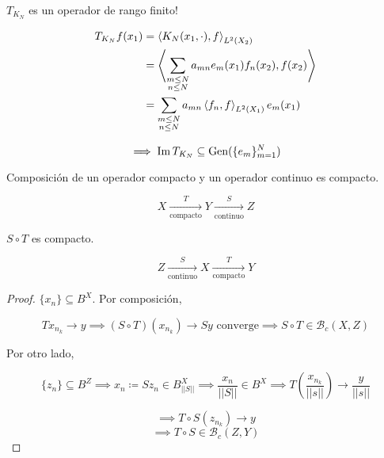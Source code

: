 \begin{fexample}
   $T_{K_N}$ es un operador de rango finito!

   \begin{align*}
       T_{K_N} f(x_1)&=\left\langle K_N(x_1,\cdot),f\right\rangle_{L^2(X_2)}\\
       &=\left\langle \sum_{\substack{m\leq N\\n\leq N}}a_{mn}e_m(x_1)f_n(x_2),f(x_2)\right\rangle\\
       &=\sum_{\substack{m\leq N\\n\leq N}}a_{mn}\left\langle f_n,f\right\rangle_{L^2(X_1)}e_m(x_1)
   \end{align*}

   \[\implies \operatorname{Im} T_{K_N}\subseteq \operatorname{Gen}(\{e_m\}_{m=1}^N)\]
\end{fexample}

\begin{fproposition}
   Composición de un operador compacto y un operador continuo es compacto.

   \[X\xrightarrow[\text{compacto}]{T}Y\xrightarrow[\text{continuo}]{S} Z\]

   $S\circ T$ es compacto.

   \[Z\xrightarrow[\text{continuo}]{S}X\xrightarrow[\text{compacto}]{T} Y\]
\end{fproposition}

\begin{proof}
   $\{x_n\}\subseteq B^X$. Por composición,

   \[Tx_{n_k}\to y\implies (S\circ T)(x_{n_k})\to Sy\text{ converge}\implies S\circ T\in\mathcal{B}_c(X,Z)\]

   Por otro lado,
   
   \[\{z_n\}\subseteq B^Z\implies x_n\coloneqq S z_n\in B_{||S||}^X\implies \frac{x_n}{||S||}\in B^X\implies T(\frac{x_{n_k}}{||s||})\to \frac{y}{||s||}\]

   \[\implies T\circ S(z_{n_k})\to y\]
   \[\implies T\circ S\in \mathcal{B}_c(Z,Y)\]
\end{proof}